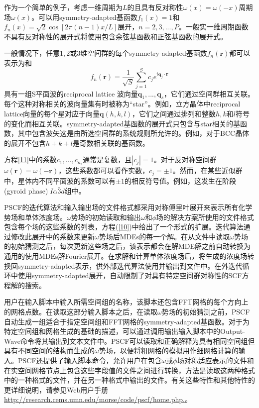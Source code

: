 \documentclass[12pt,a4paper]{article}
\begin{document}
作为一个简单的例子，考虑一维周期为$L$的且具有反对称性$\omega(x)=\omega(-x)$周期场$\omega (x)$。可以用symmetry-adapted基函数$f_1(x)=1$和$f_n(x)=\sqrt{2}\cos\left[ 2\pi (n-1)x/L \right]$展开，$n=2,3,...,P$。一般实一维周期函数不具有反对称性的展开式将使用包含余弦基函数和正弦基函数的展开式。

一般情况下，任意$1,2$或$3$维空间群的每个symmetry-adapted基函数$f_n(\mathbf{r})$都可以表示为和
\begin{equation}\label{11}
f_n(\mathbf{r})=\frac{1}{\sqrt{S}}\sum_{j=1}^{S}c_je^{i\mathbf{q}_j\cdot \mathbf{r}}
\end{equation}
具有一组S平面波的reciprocal lattice 波向量$\mathbf{q}_1,...,\mathbf{q}_s$，它们通过空间群相互关联。每个这种对称相关的波向量集有时被称为“star”。例如，立方晶体中reciprocal lattice向量的每个星对应于向量$\mathbf{q}(h,k,l)$，它们之间通过排列和整数$h,k$和$l$符号的变化而相互关联。symmetry-adapted基函数的展开式只包含与star相关的基函数，其中包含波矢这是由所选空间群的系统规则所允许的。例如，对于BCC晶体的展开不包含$h+k+l$是奇数相关联的基函数。

方程\ref{11}中的系数$c_1,...,c_{n_s}$通常是复数，且$\left|c_j\right|=1$。对于反对称空间群$\omega(\mathbf{r})=\omega(\mathbf{-r})$，这些系数都可以看作实数，$c_j=\pm 1$。然而，在某些近似群中，星体内不同平面波的系数可以有$\pm 1$的相反符号值。例如，这发生在阶段(gyroid phase)的̅$I\alpha \bar{3} d$组中。

PSCF的迭代算法和输入输出场的文件格式都采用对称傅里叶展开来表示所有化学势场和单体浓度场。$\omega$势场的初始读取和输出$\omega$和$\phi$场的解决方案所使用的文件格式包含每个场的这些系数的列表，方程(\ref{10})中给出了一个形式的扩展。迭代算法通过修改此展开中的系数来更新$\omega$势场后MDEs的每一个解。在从文件中读取$\omega$势场的初始猜测之后，每次更新这些场之后，该表示都会在解MDE解之前自动转换为通用的使用MDEs解Fourier展开。在求解和计算单体浓度场后，将生成的浓度场转换回symmetry-adapted表示，供外部迭代算法使用并输出到文件中。在外迭代循环中使用symmetry-adapted展开，自动限制了对具有特定空间群对称性的SCF方程解的搜索。

用户在输入脚本中输入所需空间组的名称，该脚本还包含FFT网格的每个方向上的网格点数。在读取这部分输入脚本之后，在读取$\omega$势场的初始猜测之前，PSCF自动生成一组适合于指定空间组和FFT网格的symmetry-adapted基函数。对于为特定空间组和网格生成的基础的描述，可以通过调用输出输入脚本中的Output-Wave命令将其输出到文本文件中。PSCF可以读取和正确解释为具有相同空间组但具有不同空间的结构而生成的$\omega$势场，以便将粗网格的模拟用作细网格计算的输入。PSCF还提供了输入脚本命令，允许用户在包含$\omega$或$\phi$场对称适应表示的文件和在实空间网格节点上包含这些字段值的文件之间进行转换，方法是读取这两种格式中的一种格式的文件，并在另一种格式中输出的文件。有关这些特性和其他特性的更详细说明，请参见Web用户手册\url{http://research.cems.umn.edu/morse/code/pscf/home.php.}。
\end{document}
